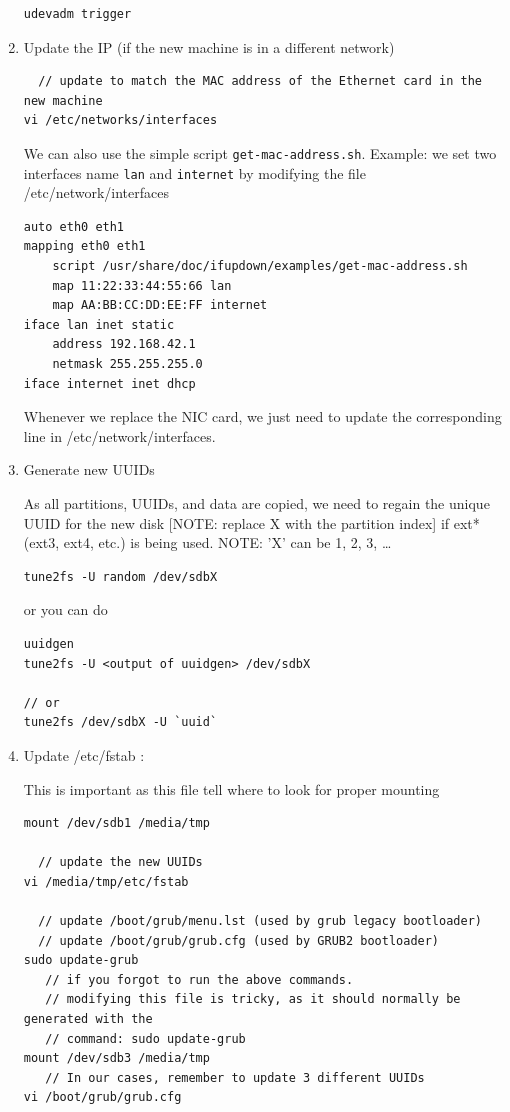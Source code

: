 \begin{enumerate}
\begin{verbatim}
udevadm trigger
\end{verbatim}

   \item Update the IP (if the new machine is in a different network)
   
\begin{verbatim}
  // update to match the MAC address of the Ethernet card in the new machine
vi /etc/networks/interfaces
\end{verbatim}   

We can also use the simple script \verb!get-mac-address.sh!. Example: we set two
interfaces name \verb!lan! and \verb!internet! by modifying the file
/etc/network/interfaces
\begin{verbatim}
auto eth0 eth1
mapping eth0 eth1
    script /usr/share/doc/ifupdown/examples/get-mac-address.sh
    map 11:22:33:44:55:66 lan
    map AA:BB:CC:DD:EE:FF internet
iface lan inet static
    address 192.168.42.1
    netmask 255.255.255.0
iface internet inet dhcp
\end{verbatim}
Whenever we replace the NIC card, we just need to update the corresponding line
in /etc/network/interfaces.

  \item Generate new UUIDs

As all partitions, UUIDs, and data are copied, we need to regain the unique UUID
for the new disk [NOTE: replace X with the partition index] if ext* (ext3,
ext4, etc.) is being used. NOTE: 'X' can be 1, 2, 3, \ldots
\begin{verbatim}
tune2fs -U random /dev/sdbX 
\end{verbatim}
or you can do
\begin{verbatim}
uuidgen 
tune2fs -U <output of uuidgen> /dev/sdbX

// or
tune2fs /dev/sdbX -U `uuid`
\end{verbatim}

   \item Update /etc/fstab : 

This is important as this file tell where to look for proper mounting
\begin{verbatim}
mount /dev/sdb1 /media/tmp

  // update the new UUIDs
vi /media/tmp/etc/fstab 

  // update /boot/grub/menu.lst (used by grub legacy bootloader)
  // update /boot/grub/grub.cfg (used by GRUB2 bootloader)
sudo update-grub
   // if you forgot to run the above commands.
   // modifying this file is tricky, as it should normally be generated with the 
   // command: sudo update-grub
mount /dev/sdb3 /media/tmp
   // In our cases, remember to update 3 different UUIDs   
vi /boot/grub/grub.cfg
\end{verbatim}   


\end{enumerate}
